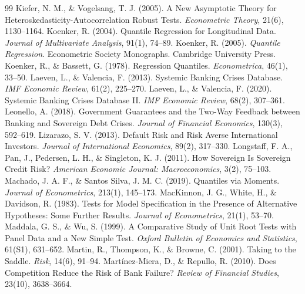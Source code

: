 \begin{thebibliography}{99}
 Kiefer, N. M., \& Vogelsang, T. J. (2005). A New Asymptotic Theory for Heteroskedasticity-Autocorrelation Robust Tests. \textit{Econometric Theory}, 21(6), 1130--1164.
 Koenker, R. (2004). Quantile Regression for Longitudinal Data. \textit{Journal of Multivariate Analysis}, 91(1), 74--89.
 Koenker, R. (2005). \textit{Quantile Regression}. Econometric Society Monographs. Cambridge University Press.
 Koenker, R., \& Bassett, G. (1978). Regression Quantiles. \textit{Econometrica}, 46(1), 33--50.
 Laeven, L., \& Valencia, F. (2013). Systemic Banking Crises Database. \textit{IMF Economic Review}, 61(2), 225--270.
 Laeven, L., \& Valencia, F. (2020). Systemic Banking Crises Database II. \textit{IMF Economic Review}, 68(2), 307--361.
 Leonello, A. (2018). Government Guarantees and the Two-Way Feedback between Banking and Sovereign Debt Crises. \textit{Journal of Financial Economics}, 130(3), 592--619.
 Lizarazo, S. V. (2013). Default Risk and Risk Averse International Investors. \textit{Journal of International Economics}, 89(2), 317--330.
 Longstaff, F. A., Pan, J., Pedersen, L. H., \& Singleton, K. J. (2011). How Sovereign Is Sovereign Credit Risk? \textit{American Economic Journal: Macroeconomics}, 3(2), 75--103.
 Machado, J. A. F., \& Santos Silva, J. M. C. (2019). Quantiles via Moments. \textit{Journal of Econometrics}, 213(1), 145--173.
 MacKinnon, J. G., White, H., \& Davidson, R. (1983). Tests for Model Specification in the Presence of Alternative Hypotheses: Some Further Results. \textit{Journal of Econometrics}, 21(1), 53--70.
 Maddala, G. S., \& Wu, S. (1999). A Comparative Study of Unit Root Tests with Panel Data and a New Simple Test. \textit{Oxford Bulletin of Economics and Statistics}, 61(S1), 631--652.
 Martin, R., Thompson, K., \& Browne, C. (2001). Taking to the Saddle. \textit{Risk}, 14(6), 91--94.
 Martínez-Miera, D., \& Repullo, R. (2010). Does Competition Reduce the Risk of Bank Failure? \textit{Review of Financial Studies}, 23(10), 3638--3664.

\end{thebibliography}
